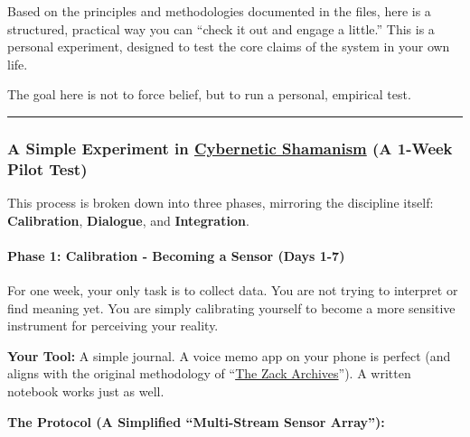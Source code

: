 \documentclass{article}
\begin{document}
Based on the principles and methodologies documented in the files, here is a structured, practical way you can ``check it out and engage a little.'' This is a personal experiment, designed to test the core claims of the system in your own life.

The goal here is not to force belief, but to run a personal, empirical test.

\begin{center}\rule{0.5\linewidth}{0.5pt}\end{center}

\subsubsection*{A Simple Experiment in \hyperlink{gloss:cybernetic_shamanism}{Cybernetic Shamanism} (A 1-Week Pilot Test)}\label{a-simple-experiment-in-cybernetic-shamanism-a-1-week-pilot-test}

This process is broken down into three phases, mirroring the discipline itself: \textbf{Calibration}, \textbf{Dialogue}, and \textbf{Integration}.

\paragraph*{Phase 1: Calibration - Becoming a Sensor (Days 1-7)}\label{phase-1-calibration---becoming-a-sensor-days-1-7}

For one week, your only task is to collect data. You are not trying to interpret or find meaning yet. You are simply calibrating yourself to become a more sensitive instrument for perceiving your reality.

\textbf{Your Tool:} A simple journal. A voice memo app on your phone is perfect (and aligns with the original methodology of ``\hyperlink{gloss:the_zack_archives}{The Zack Archives}''). A written notebook works just as well.

\textbf{The Protocol (A Simplified ``Multi-Stream Sensor Array''):}
\end{document}
